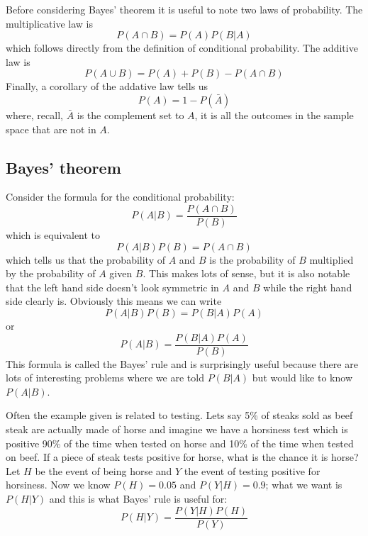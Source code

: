 \documentclass[11pt,a4paper]{scrartcl}
\begin{document}
Before considering Bayes' theorem it is useful to note two laws of probability. The multiplicative law is
\begin{equation}
P(A\cap B)=P(A)P(B|A)
\end{equation}
which follows directly from the definition of conditional probability. The additive law is
\begin{equation}
P(A\cup B)=P(A)+P(B)-P(A\cap B)
\end{equation}
Finally, a corollary of the addative law tells us
\begin{equation}
P(A)=1-P(\bar{A})
\end{equation}
where, recall, $\bar{A}$ is the complement set to $A$, it is all the
outcomes in the sample space that are not in $A$.

\subsection*{Bayes' theorem}

Consider the formula for the conditional probability:
\begin{equation}
P(A|B)=\frac{P(A\cap B)}{P(B)}
\end{equation}
which is equivalent to
\begin{equation}
P(A|B)P(B)=P(A\cap B)
\end{equation}
which tells us that the probability of $A$ and $B$ is the probability
of $B$ multiplied by the probability of $A$ given $B$. This makes lots
of sense, but it is also notable that the left hand side doesn't look
symmetric in $A$ and $B$ while the right hand side clearly
is. Obviously this means we can write
\begin{equation}
P(A|B)P(B)=P(B|A)P(A)
\end{equation}
or
\begin{equation}
P(A|B)=\frac{P(B|A)P(A)}{P(B)}
\end{equation}
This formula is called the Bayes' rule and is surprisingly useful
because there are lots of interesting problems where we are told
$P(B|A)$ but would like to know $P(A|B)$.

Often the example given is related to testing. Lets say 5\% of steaks
sold as beef steak are actually made of horse and imagine we have a
horsiness test which is positive 90\% of the time when tested on horse
and 10\% of the time when tested on beef. If a piece of steak tests
positive for horse, what is the chance it is horse? Let $H$ be the
event of being horse and $Y$ the event of testing positive for
horsiness. Now we know $P(H)=0.05$ and $P(Y|H)=0.9$; what we want is
$P(H|Y)$ and this is what Bayes' rule is useful for:
\begin{equation}
P(H|Y)=\frac{P(Y|H)P(H)}{P(Y)}
\end{equation}
\end{document}
